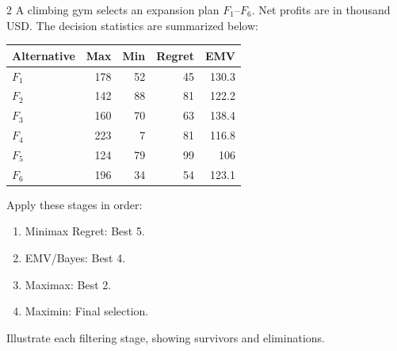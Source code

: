 \begin{multicols}{2}
\raggedcolumns
{}
A climbing gym selects an expansion plan $F_1$--$F_6$. Net profits are in thousand USD. The decision statistics are summarized below:
\vspace{-3mm}
\begin{center}\small\setlength{\tabcolsep}{4pt}
	\begin{tabular}{lrrrr}\toprule
		Alternative & Max & Min & Regret & EMV\\ \midrule
		$F_1$ & 178 & 52 & 45 & 130.3\\
		$F_2$ & 142 & 88 & 81 & 122.2\\
		$F_3$ & 160 & 70 & 63 & 138.4\\
		$F_4$ & 223 & 7 & 81 & 116.8\\
		$F_5$ & 124 & 79 & 99 & 106\\
		$F_6$ & 196 & 34 & 54 & 123.1\\
		\bottomrule
	\end{tabular}
\end{center}
\vspace{-3mm}
Apply these stages in order:
\begin{enumerate}[leftmargin=*]
	\item Minimax Regret: Best 5.
	\item EMV/Bayes: Best 4.
	\item Maximax: Best 2.
	\item Maximin: Final selection.
\end{enumerate}
Illustrate each filtering stage, showing survivors and eliminations.



\end{multicols}
